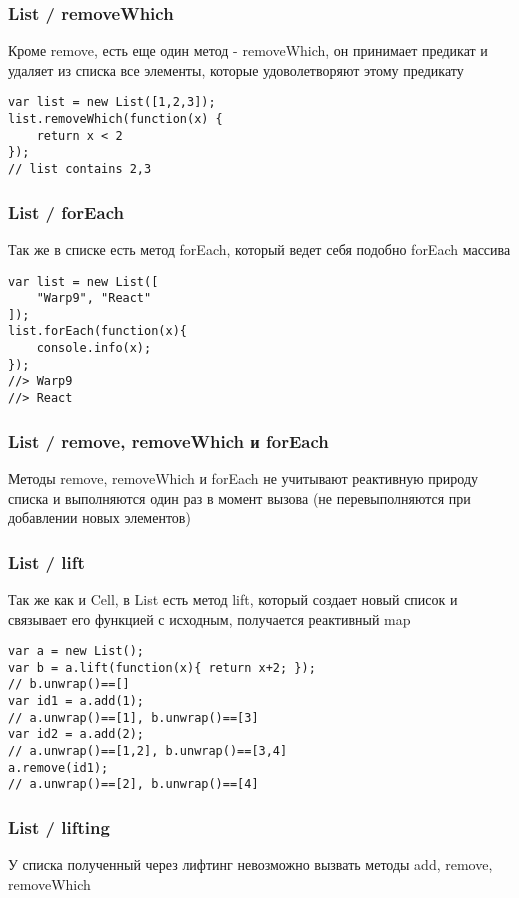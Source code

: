 \documentclass[xetex]{beamer}
\begin{document}
\begin{frame}[fragile]
\frametitle{List / removeWhich}
Кроме remove, есть еще один метод - removeWhich, он принимает предикат и удаляет из списка все элементы, которые удоволетворяют этому предикату

\vspace{10mm}
\begin{lstlisting}
var list = new List([1,2,3]);
list.removeWhich(function(x) { 
    return x < 2 
});
// list contains 2,3
\end{lstlisting}
\end{frame}


\begin{frame}[fragile]
\frametitle{List / forEach}
Так же в списке есть метод forEach, который ведет себя подобно forEach массива

\vspace{10mm}
\begin{lstlisting}
var list = new List([
    "Warp9", "React"
]);
list.forEach(function(x){
    console.info(x); 
});
//> Warp9
//> React
\end{lstlisting}
\end{frame}


\begin{frame}[fragile]
\frametitle{List / remove, removeWhich и forEach}
Методы remove, removeWhich и forEach не учитывают реактивную природу списка и выполняются один раз в момент вызова (не перевыполняются при добавлении новых элементов)
\end{frame}


\begin{frame}[fragile]
\frametitle{List / lift}
Так же как и Cell, в List есть метод lift, который создает новый список и связывает его функцией с исходным, получается реактивный map

\vspace{6mm}
\lstset{
  xleftmargin=.03\textwidth, xrightmargin=.03\textwidth
}
\begin{lstlisting}
var a = new List(); 
var b = a.lift(function(x){ return x+2; }); 
// b.unwrap()==[]
var id1 = a.add(1); 
// a.unwrap()==[1], b.unwrap()==[3]
var id2 = a.add(2); 
// a.unwrap()==[1,2], b.unwrap()==[3,4]
a.remove(id1); 
// a.unwrap()==[2], b.unwrap()==[4]
\end{lstlisting}
\end{frame}


\begin{frame}[fragile]
\frametitle{List / lifting}
У списка полученный через лифтинг невозможно вызвать методы add, remove, removeWhich
\end{frame}
\end{document}
